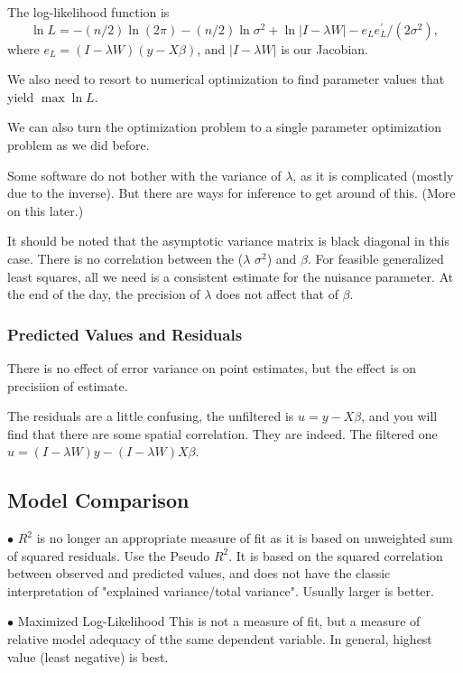 \documentclass[11pt,a4paper]{amsart}
\theoremstyle{plain}
\theoremstyle{definition}
\begin{document}
The log-likelihood function is 
\[	\ln L = -(n/2)\ln(2\pi) - (n/2) \ln \sigma^{2} + \ln |I -\lambda W| - e_{L}e_{L}^{'}/(2\sigma^{2}),	\]
where $e_{L} = (I-\lambda W) (y - X\beta)$, and $ |I -\lambda W| $ is our Jacobian.

We also need to resort to numerical optimization to find parameter values that yield $\max \ln L$.

We can also turn the optimization problem to a single parameter optimization problem as we did before. 

Some software do not bother with the variance of $\lambda$, as it is complicated (mostly due to the inverse). But there are ways for inference to get around of this. (More on this later.)

It should be noted that the asymptotic variance matrix is black diagonal in this case. There is no correlation between the ($\lambda$  $\sigma^{2}$) and $\beta$. For feasible generalized least squares, all we need is a consistent estimate for the nuisance parameter.  At the end of the day, the precision of $\lambda$ does not affect that of $\beta$.

\subsubsection{Predicted Values and Residuals}\hfill\par 
There is no effect of error variance on point estimates, but the effect is on precisiion of estimate. 

The residuals are a little confusing, the unfiltered is $u = y - X \beta$, and you will find that there are some spatial correlation. They are indeed. The filtered one $u = (I-\lambda W) y - (I -\lambda W) X\beta$. 

\subsection{Model Comparison}\hfill\par 
$\bullet$ $R^{2}$ is no longer an appropriate measure of fit as it is based on unweighted sum of squared residuals. Use the Pseudo $R^{2}$. It is based on the squared correlation between observed and predicted values, and does not have the classic interpretation of "explained variance/total variance". Usually larger is better.

$\bullet$ Maximized Log-Likelihood This is not a measure of fit, but a measure of relative model adequacy of tthe same dependent variable. In general, highest value (least negative) is best.
\end{document}
